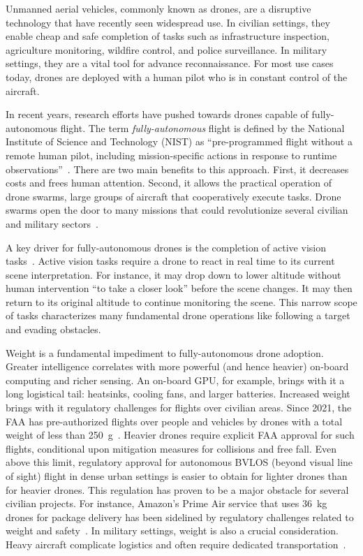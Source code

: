 Unmanned aerial vehicles, commonly known as drones, are a disruptive technology that have recently seen widespread use. In civilian settings, they enable cheap and safe completion of tasks such as infrastructure inspection, agriculture monitoring, wildfire control, and police surveillance. In military settings, they are a vital tool for advance reconnaissance. For most use cases today, drones are deployed with a human pilot who is in constant control of the aircraft.

In recent years, research efforts have pushed towards drones capable of fully-autonomous flight. The term \textit{fully-autonomous} flight is defined by the National Institute of Science and Technology (NIST) as “pre-programmed flight without a remote human pilot, including mission-specific actions in response to runtime observations”~\cite{Huang2008}. There are two main benefits to this approach. First, it decreases costs and frees human attention. Second, it allows the practical operation of drone swarms, large groups of aircraft that cooperatively execute tasks. Drone swarms open the door to many missions that could revolutionize several civilian and military sectors~\cite{Burkle2009}. 

A key driver for fully-autonomous drones is the completion of active vision tasks~\cite{Aloimonos1988, Ognibene2013}. Active vision tasks require a drone to react in real time to its current scene interpretation. For instance, it may drop down to lower altitude without human intervention ``to take a closer look'' before the scene changes.  It may then return to its original altitude to continue monitoring the scene. This narrow scope of tasks characterizes many fundamental drone operations like following a target and evading obstacles.

Weight is a fundamental impediment to fully-autonomous drone adoption. Greater intelligence correlates with more powerful (and hence heavier) on-board computing and richer sensing. An on-board GPU, for example, brings with it a long logistical tail: heatsinks, cooling fans, and larger batteries. Increased weight brings with it regulatory challenges for flights over civilian areas. Since 2021, the FAA has pre-authorized flights over people and vehicles by drones with a total weight of less than 250~g~\cite{FAA2021}. Heavier drones require explicit FAA approval for such flights, conditional upon mitigation measures for collisions and free fall. Even above this limit, regulatory approval for autonomous BVLOS (beyond visual line of sight) flight in dense urban settings is easier to obtain for lighter drones than for heavier drones. This regulation has proven to be a major obstacle for several civilian projects. For instance, Amazon’s Prime Air service that uses 36~kg drones for package delivery has been sidelined by regulatory challenges related to weight and safety~\cite{Link2023}. In military settings, weight is also a crucial consideration. Heavy aircraft complicate logistics and often require dedicated transportation~\cite{DefensePost}. 

